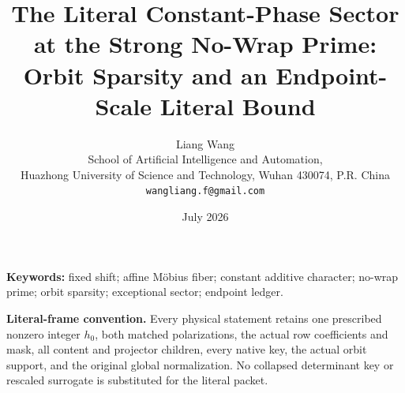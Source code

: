 \documentclass[11pt]{article}
\title{The Literal Constant-Phase Sector at the Strong No-Wrap Prime:\\
Orbit Sparsity and an Endpoint-Scale Literal Bound}
\author{Liang Wang\\
School of Artificial Intelligence and Automation,\\
Huazhong University of Science and Technology, Wuhan 430074, P.R. China\\
\texttt{wangliang.f@gmail.com}}
\date{July 2026}
\theoremstyle{remark}
\begin{document}
\maketitle



\noindent\textbf{Keywords:} fixed shift; affine M\"obius fiber;
constant additive character; no-wrap prime; orbit sparsity;
exceptional sector; endpoint ledger.

\medskip
\noindent\textbf{Literal-frame convention.}
Every physical statement retains one prescribed nonzero integer
\(h_0\), both matched polarizations, the actual row coefficients and
mask, all content and projector children, every native key, the
actual orbit support, and the original global normalization.  No
collapsed determinant key or rescaled surrogate is substituted for
the literal packet.










\begingroup
\footnotesize
\raggedright


\endgroup
\end{document}
